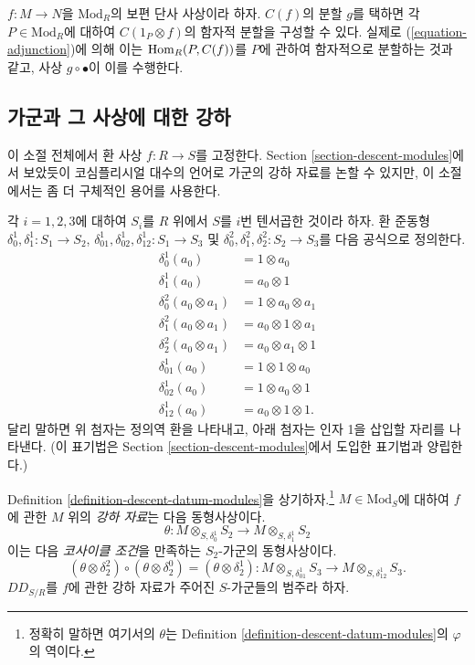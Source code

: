 \begin{remark}
\label{remark-functorial-splitting}
$f: M \to N$을 $\text{Mod}_R$의 보편 단사 사상이라 하자. $C(f)$의 분할
$g$를 택하면 각 $P \in \text{Mod}_R$에 대하여 $C(1_P \otimes f)$의
함자적 분할을 구성할 수 있다. 실제로 (\ref{equation-adjunction})에 의해
이는 $\mathop{\mathrm{Hom}}\nolimits_R(P, C(f))$를 $P$에 관하여 함자적으로 분할하는 것과 같고,
사상 $g \circ \bullet$이 이를 수행한다.
\end{remark}


\subsection{가군과 그 사상에 대한 강하}
\label{subsection-descent-modules-morphisms}

\noindent
이 소절 전체에서 환 사상 $f: R \to S$를 고정한다. Section
\ref{section-descent-modules}에서 보았듯이 코심플리시얼 대수의 언어로
가군의 강하 자료를 논할 수 있지만, 이 소절에서는 좀 더 구체적인 용어를
사용한다.

\medskip\noindent
각 $i = 1, 2, 3$에 대하여 $S_i$를 $R$ 위에서 $S$를 $i$번 텐서곱한
것이라 하자. 환 준동형 $\delta_0^1, \delta_1^1: S_1 \to S_2$,
$\delta_{01}^1, \delta_{02}^1, \delta_{12}^1: S_1 \to S_3$ 및
$\delta_0^2, \delta_1^2, \delta_2^2: S_2 \to S_3$를 다음 공식으로 정의한다.
\begin{align*}
\delta^1_0  (a_0) & =  1 \otimes a_0 \\
\delta^1_1  (a_0) & = a_0 \otimes 1 \\
\delta^2_0  (a_0 \otimes a_1) & =  1 \otimes a_0 \otimes a_1 \\
\delta^2_1  (a_0 \otimes a_1) & =  a_0 \otimes 1 \otimes a_1 \\
\delta^2_2  (a_0 \otimes a_1) & =  a_0 \otimes a_1 \otimes 1 \\
\delta_{01}^1(a_0) & = 1 \otimes 1 \otimes a_0 \\
\delta_{02}^1(a_0) & = 1 \otimes a_0 \otimes 1 \\
\delta_{12}^1(a_0) & = a_0 \otimes 1 \otimes 1.
\end{align*}
달리 말하면 위 첨자는 정의역 환을 나타내고, 아래 첨자는 인자 1을
삽입할 자리를 나타낸다. (이 표기법은 Section
\ref{section-descent-modules}에서 도입한 표기법과 양립한다.)

\medskip\noindent
Definition \ref{definition-descent-datum-modules}을
상기하자.\footnote{정확히 말하면 여기서의 $\theta$는 Definition
\ref{definition-descent-datum-modules}의 $\varphi$의 역이다.}
$M \in \text{Mod}_S$에 대하여 $f$에 관한 $M$ 위의 {\it 강하 자료}는
다음 동형사상이다.
$$
\theta :
M \otimes_{S,\delta^1_0} S_2
\longrightarrow
M \otimes_{S,\delta^1_1} S_2
$$
이는 다음 {\it 코사이클 조건}을 만족하는 $S_2$-가군의 동형사상이다.
\begin{equation}
\label{equation-cocycle-condition}
(\theta \otimes \delta_2^2) \circ (\theta \otimes \delta_2^0) = (\theta \otimes 
\delta_2^1):
M \otimes_{S, \delta^1_{01}} S_3 \to M \otimes_{S,\delta^1_{12}} S_3.
\end{equation}
$DD_{S/R}$를 $f$에 관한 강하 자료가 주어진 $S$-가군들의 범주라 하자.

